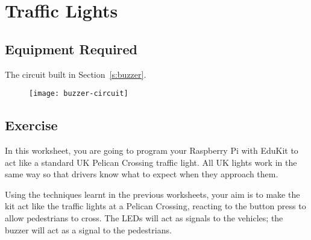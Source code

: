 \section{Traffic Lights}


\subsection*{Equipment Required}

The circuit built in Section~\ref{s:buzzer}.

\begin{figure}[htbp]
  \centering
  \texttt{[image: buzzer-circuit]}
\end{figure}

\subsection*{Exercise}

In this worksheet, you are going to program your Raspberry Pi with EduKit to act like a standard UK Pelican Crossing traffic light.  All UK lights work in the same way so that drivers know what to expect when they approach them.

Using the techniques learnt in the previous worksheets, your aim is to make the kit act like the traffic lights at a Pelican Crossing, reacting to the button press to allow pedestrians to cross.  The LEDs will act as signals to the vehicles; the buzzer will act as a signal to the pedestrians.

